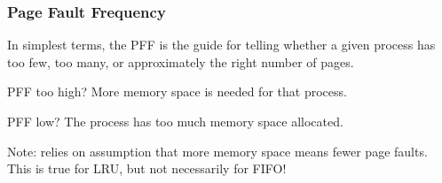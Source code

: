 \begin{frame}
\frametitle{Page Fault Frequency}

In simplest terms, the PFF is the guide for telling whether a given process has too few, too many, or approximately the right number of pages. 

PFF too high? More memory space is needed for that process.

PFF low? The process has too much memory space allocated.

Note: relies on assumption that more memory space means fewer page faults.\\
\quad This is true for LRU, but not necessarily for FIFO!

\end{frame}



